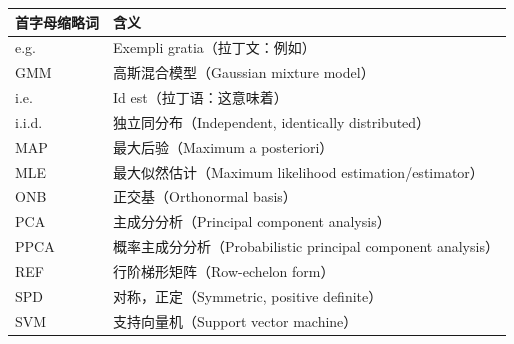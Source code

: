 \begin{longtable}{>{\raggedright\arraybackslash}p{\dimexpr(\textwidth-24pt)/2\relax} >{\raggedright\arraybackslash}p{\dimexpr(\textwidth-24pt)/2\relax}}
\hline
\textbf{首字母缩略词} & \textbf{含义} \\ \hline
\endhead
e.g. & Exempli gratia（拉丁文：例如） \\ \hline
GMM & 高斯混合模型（Gaussian mixture model） \\ \hline
i.e. & Id est（拉丁语：这意味着） \\ \hline
i.i.d. & 独立同分布（Independent, identically distributed） \\ \hline
MAP & 最大后验（Maximum a posteriori） \\ \hline
MLE & 最大似然估计（Maximum likelihood estimation/estimator） \\ \hline
ONB & 正交基（Orthonormal basis） \\ \hline
PCA & 主成分分析（Principal component analysis） \\ \hline
PPCA & 概率主成分分析（Probabilistic principal component analysis） \\ \hline
REF & 行阶梯形矩阵（Row-echelon form） \\ \hline
SPD & 对称，正定（Symmetric, positive definite） \\ \hline
SVM & 支持向量机（Support vector machine） \\ \hline
\end{longtable}
